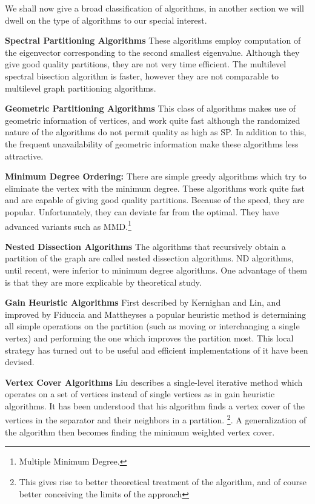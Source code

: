 \documentclass[a4paper,12pt]{article}
\begin{document}
We shall now give a broad classification of algorithms, in another
section we will dwell on the type of algorithms to our special interest.
\begin{description}
\item{\textbf{Spectral Partitioning Algorithms}} These algorithms
employ computation of the eigenvector corresponding to the second
smallest eigenvalue. Although they give good quality partitions, they
are not very time efficient. The multilevel spectral bisection
algorithm is faster, however they are not comparable to multilevel
graph partitioning algorithms. \cite{kumar}
\item{\textbf{Geometric Partitioning Algorithms}} This class of algorithms
makes use of geometric information of vertices, and work quite fast
although the randomized nature of the algorithms do not permit
quality as high as SP. In addition to this, the frequent unavailability of
geometric information make these algorithms less attractive. \cite{kumar}
\item{\textbf{Minimum Degree Ordering:}} There are simple greedy
algorithms which try to eliminate the vertex with the minimum degree.
These algorithms work quite fast and are capable of giving good
quality partitions. Because of the speed, they are
popular. Unfortunately, they can deviate far from the
optimal\cite{bend}. They have advanced variants such as
MMD.\footnote{Multiple Minimum Degree.}
\item{\textbf{Nested Dissection Algorithms}} The algorithms that
recursively obtain a partition of the graph are called nested
dissection algorithms.\cite{liu} \cite{bend} ND algorithms, until
recent, were inferior to minimum degree algorithms. One advantage
of them is that they are more explicable by theoretical study.
\item{\textbf{Gain Heuristic Algorithms}} First described by Kernighan
and Lin\cite{kl}, and improved by Fiduccia and Mattheyses\cite{fm} a
popular heuristic method is determining all simple operations on the
partition (such as moving or interchanging a single vertex) and
performing the one which improves the partition most. This local
strategy has turned out to be useful and efficient
implementations of it have been devised.\cite{kumar} \cite{bend} \cite{gupta1}
\item{\textbf{Vertex Cover Algorithms}} Liu describes a single-level
iterative method which operates on a set of vertices instead of single
vertices as in gain heuristic algorithms.\cite{liu} It has been
understood that his algorithm finds a vertex cover of the vertices in
the separator and their neighbors in a partition.\cite{bend}
\footnote{This gives
rise to better theoretical treatment of the algorithm, and of course
better conceiving the limits of the approach}. A generalization of the
algorithm then becomes finding the minimum weighted vertex cover.
\end{description}
\end{document}
